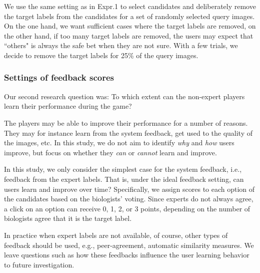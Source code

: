 We use the same setting as in Expr.1 to select candidates and deliberately remove
the target labels from the candidates for a set of randomly selected query images. 
On the one hand, we want sufficient cases where the target labels are removed, 
on the other hand, if too many target labels are removed, the users may
expect that ``others" is always the safe bet when they are not sure.   
With a few trials, we decide to remove the target labels for 25\% of the query images. 
%

\subsubsection{Settings of feedback scores}
Our second research question was: To which extent can the non-expert players learn their performance during the game?

The players may be able to improve their performance for a number of reasons.
They may for instance learn from the system feedback, get used to the quality of the images, etc.
In this study, we do not aim to identify \emph{why} and \emph{how} users improve, but focus on whether
they \emph{can} or \emph{cannot} learn and improve. 

In this study, we only consider the simplest case for the system feedback, i.e., feedback from the expert labels.
That is, under the ideal feedback setting, can users learn and improve over time?
Specifically, we assign scores to each option of the candidates based on the biologists' voting. 
Since experts do not always agree, a click on an option can receive 0, 1, 2, or 3 points, 
depending on the number of biologists agree that it is the target label. 

In practice when expert labels are not available, of course, other types of feedback should be used, e.g., 
peer-agreement, automatic similarity measures. 
We leave questions such as how these feedbacks influence the user learning behavior to future investigation.

